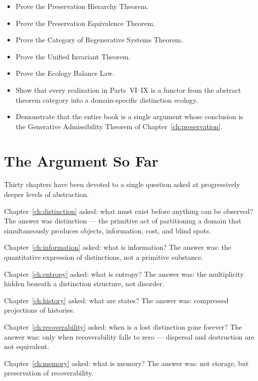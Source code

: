 \documentclass[12pt,twoside,openright]{book}
\newenvironment{objectives}{%
  \begin{tcolorbox}[colback=DistBlue!5,colframe=DistBlue,
    title={\faCheckCircle\enspace Learning Objectives},
    fonttitle=\sffamily\bfseries\color{white},
    attach boxed title to top left={yshift=-2mm,xshift=4mm},
    boxed title style={colback=DistBlue},breakable]
  \begin{itemize}[leftmargin=*,nosep]}{%
  \end{itemize}\end{tcolorbox}\vspace{1em}}
\begin{document}
\begin{objectives}
  \item Prove the Preservation Hierarchy Theorem.
  \item Prove the Preservation Equivalence Theorem.
  \item Prove the Category of Regenerative Systems Theorem.
  \item Prove the Unified Invariant Theorem.
  \item Prove the Ecology Balance Law.
  \item Show that every realization in Parts~VI--IX is a
        functor from the abstract theorem category into
        a domain-specific distinction ecology.
  \item Demonstrate that the entire book is a single
        argument whose conclusion is the Generative
        Admissibility Theorem of Chapter~\ref{ch:preservation}.
\end{objectives}

\section{The Argument So Far}
\label{sec:ch30-arg}

Thirty chapters have been devoted to a single question
asked at progressively deeper levels of abstraction.

Chapter~\ref{ch:distinction} asked: what must exist before
anything can be observed? The answer was distinction — the
primitive act of partitioning a domain that simultaneously
produces objects, information, cost, and blind spots.

Chapter~\ref{ch:information} asked: what is information?
The answer was: the quantitative expression of distinctions,
not a primitive substance.

Chapter~\ref{ch:entropy} asked: what is entropy? The answer
was: the multiplicity hidden beneath a distinction structure,
not disorder.

Chapter~\ref{ch:history} asked: what are states? The answer
was: compressed projections of histories.

Chapter~\ref{ch:recoverability} asked: when is a lost
distinction gone forever? The answer was: only when
recoverability falls to zero — dispersal and destruction
are not equivalent.

Chapter~\ref{ch:memory} asked: what is memory? The answer
was: not storage, but preservation of recoverability.
\end{document}
